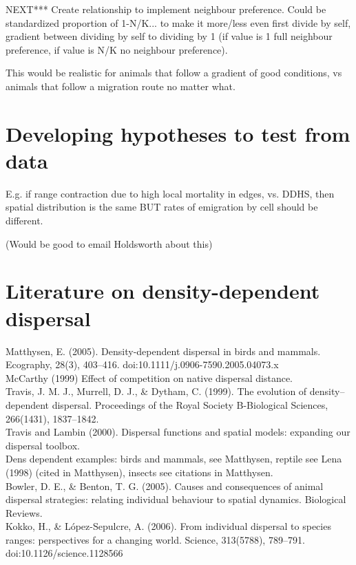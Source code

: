 \documentclass{article}
\begin{document}
NEXT*** Create relationship to implement neighbour preference. Could be
standardized proportion of 1-N/K... to make it more/less even first
divide by self, gradient between dividing by self to dividing by 1 (if
value is 1 full neighbour preference, if value is N/K no neighbour
preference).

This would be realistic for animals that follow a gradient of good
conditions, vs animals that follow a migration route no matter what.

\section{Developing hypotheses to test from data}
E.g. if range contraction due to high local mortality in edges,
vs. DDHS, then spatial distribution is the same BUT rates of
emigration by cell should be different.

(Would be good to email Holdsworth about this)

\section*{Literature on density-dependent dispersal}
Matthysen, E. (2005). Density-dependent dispersal in birds and
mammals. Ecography, 28(3),
403–416. doi:10.1111/j.0906-7590.2005.04073.x \\

McCarthy (1999) Effect of competition on native dispersal distance.\\

Travis, J. M. J., Murrell, D. J., \& Dytham, C. (1999). The evolution
of density–dependent dispersal. Proceedings of the Royal Society
B-Biological Sciences, 266(1431), 1837–1842. \\

Travis and Lambin (2000). Dispersal functions and spatial models:
expanding our dispersal toolbox. \\

Dens dependent examples: birds and mammals, see Matthysen, reptile see
Lena (1998) (cited in Matthysen), insects see citations in
Matthysen.\\

Bowler, D. E., \& Benton, T. G. (2005). Causes and consequences of
animal dispersal strategies: relating individual behaviour to spatial
dynamics. Biological Reviews. \\

Kokko, H., \& López-Sepulcre, A. (2006). From individual dispersal to
species ranges: perspectives for a changing world. Science, 313(5788),
789–791. doi:10.1126/science.1128566\\
\end{document}

